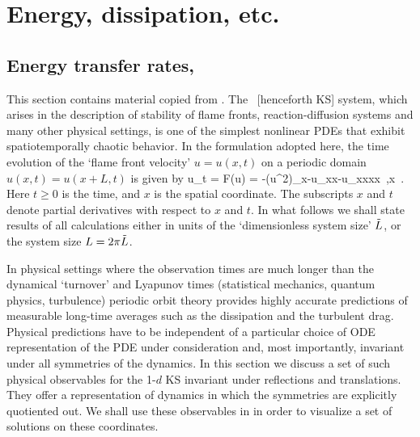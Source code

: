 \section{Energy, dissipation, etc.}

\subsection{Energy transfer rates, \KS}
\label{sec:energy}

This section contains material copied from .
The \KS\ [henceforth KS] system,
which arises in the description of
stability of flame fronts, reaction-diffusion systems and many other
physical settings, is one of the simplest nonlinear PDEs that
exhibit spatiotemporally chaotic behavior. In the formulation
adopted here, the time evolution of the `flame front velocity'
$u=u(x,t)$ on a periodic domain $u(x,t) = u(x+L,t)$ is given by
\beq
  u_t = F(u) = -{\textstyle{}}(u^2)_x-u_{xx}-u_{xxxx}
    \,,\qquad   x \in [-L/2,L/2]
    \,.
Here $t \geq 0$ is the time, and $x$ is the spatial coordinate.
The subscripts $x$ and $t$ denote partial derivatives with respect to
$x$ and $t$. In what follows
we shall state results of all calculations either in units of the
`dimensionless system size' $\tilde{L}$, or the system size $L = 2 \pi
\tilde{L}$.

In physical settings where the observation times are much
longer than the dynamical `turnover' and Lyapunov times
(statistical mechanics, quantum physics, turbulence) periodic
orbit theory provides highly accurate predictions
of measurable long-time averages such as the dissipation and
the turbulent drag. Physical predictions have to
be independent of a particular choice of ODE representation
of the PDE under consideration and, most importantly,
invariant under all symmetries of the dynamics. In this
section we discuss a set of such physical observables for the
1-$d$ KS invariant under reflections and translations. They
offer a representation of dynamics in which the symmetries
are explicitly quotiented out. We shall use these
{observables} in  in order to
visualize a set of solutions on these coordinates.


